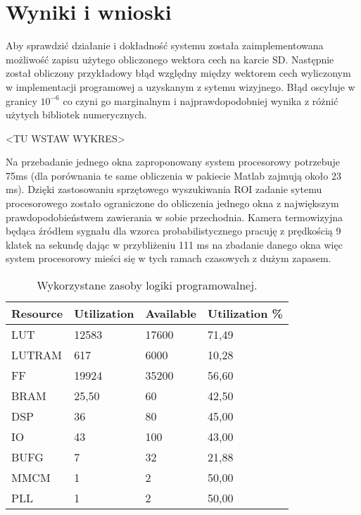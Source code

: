 \chapter{Wyniki i wnioski}

Aby sprawdzić działanie i dokładność systemu została zaimplementowana możliwość zapisu użytego obliczonego wektora cech na karcie SD. Następnie został obliczony przykładowy błąd względny między wektorem cech wyliczonym w implementacji programowej a uzyskanym z sytemu wizyjnego. Błąd oscyluje w granicy \(10^{-6}\) co czyni go marginalnym i najprawdopodobniej wynika z różnić użytych bibliotek numerycznych.

<TU WSTAW WYKRES>

Na przebadanie jednego okna zaproponowany system procesorowy potrzebuje 75ms  (dla porównania te same obliczenia w pakiecie Matlab zajmują około 23 ms). Dzięki zastosowaniu sprzętowego wyszukiwania ROI zadanie sytemu procesorowego zostało ograniczone do obliczenia jednego okna z największym prawdopodobieństwem zawierania w sobie przechodnia. Kamera termowizyjna będąca źródłem sygnału dla wzorca probabilistycznego pracuję z prędkością 9 klatek na sekundę dając w przybliżeniu 111 ms na zbadanie danego okna więc system procesorowy mieści się w tych ramach czasowych z dużym zapasem. 

\begin{table}[]
\centering
\caption{Wykorzystane zasoby logiki programowalnej.}
\label{tab:resources}
\begin{tabular}{|l|l|l|l|}
\hline
Resource & Utilization & Available & Utilization \% \\ \hline
LUT & 12583 & 17600 & 71,49 \\ \hline 
LUTRAM & 617 & 6000 & 10,28 \\ \hline 
FF & 19924 & 35200 & 56,60 \\ \hline
BRAM & 25,50 & 60 & 42,50 \\ \hline
DSP & 36 & 80 & 45,00 \\ \hline
IO & 43 & 100 & 43,00 \\ \hline
BUFG & 7 & 32 & 21,88 \\ \hline
MMCM & 1 & 2 & 50,00 \\ \hline
PLL & 1 & 2 & 50,00 \\ \hline
\end{tabular}
\end{table}